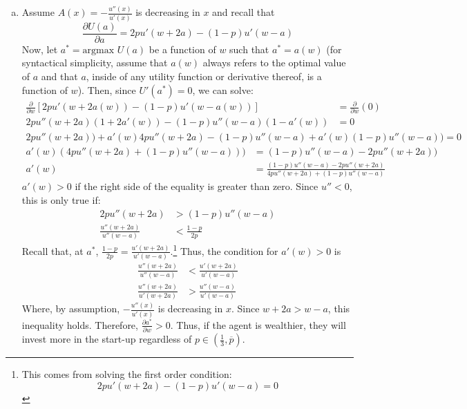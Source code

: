 \documentclass{article}
\newcommand{\olp}{\overline{p}}
\begin{document}
\begin{enumerate}[(a)]
	\item Assume $A(x)= -\frac{u''(x)}{u'(x)}$ is decreasing in $x$ and recall that 
		\[
			\frac{\partial U(a)}{\partial a} = 2pu'(w+2a) - (1-p)u'(w-a)
		\]
		Now, let $a^*=\text{argmax }U(a)$ be a function of $w$ such that $a^*=a(w)$ (for syntactical simplicity, assume that $a(w)$ always refers to the optimal value of $a$ and that $a$, inside of any utility function or derivative thereof, is a function of $w$). Then, since $U'(a^*)=0$, we can solve:
		\begin{align*}
			\frac{\partial}{\partial w}\left[ 2pu'(w+2a(w)) - (1-p)u'(w-a(w)) \right] &= \frac{\partial}{\partial w}(0)	\\
			2pu''(w+2a)(1+2a'(w)) - (1-p)u''(w-a)(1-a'(w)) &= 0	
		\end{align*}
		\begin{align*}
			2pu''(w+2a)) + a'(w)4pu''(w+2a) - (1-p)u''(w-a) + a'(w)(1-p)u''(w-a)) = 0
		\end{align*}
		\begin{align*}
			a'(w)(4pu''(w+2a)+(1-p)u''(w-a))) &=  (1-p)u''(w-a) - 2pu''(w+2a)) \\
			a'(w) &= \frac{(1-p)u''(w-a) - 2pu''(w+2a)}{4pu''(w+2a)+(1-p)u''(w-a)}
		\end{align*}
		$a'(w)>0$ if the right side of the equality is greater than zero. Since $u''<0$, this is only true if:
		\begin{align*}
			2pu''(w+2a) &> (1-p)u''(w-a)	\\
			\frac{u''(w+2a)}{u''(w-a)} &< \frac{1-p}{2p}
		\end{align*}
		Recall that, at $a^*$, ${\frac{1-p}{2p} = \frac{u'(w+2a)}{u'(w-a)}}$.\footnote{This comes from solving the first order condition: \[ 2pu'(w+2a) - (1-p)u'(w-a)=0 \]} Thus, the condition for $a'(w)>0$ is
		\begin{align*}
			\frac{u''(w+2a)}{u''(w-a)} &< \frac{u'(w+2a)}{u'(w-a)}	\\
			\frac{u''(w+2a)}{u'(w+2a)} &> \frac{u''(w-a)}{u'(w-a)}
		\end{align*}
		Where, by assumption, $-\frac{u''(x)}{u'(x)}$ is decreasing in $x$. Since ${w+2a>w-a}$, this inequality holds. Therefore, ${\frac{\partial a^*}{\partial w}>0}$. Thus, if the agent is wealthier, they will invest more in the start-up regardless of ${p\in(\frac{1}{3},\olp)}$.
		

\end{enumerate}
\end{document}
